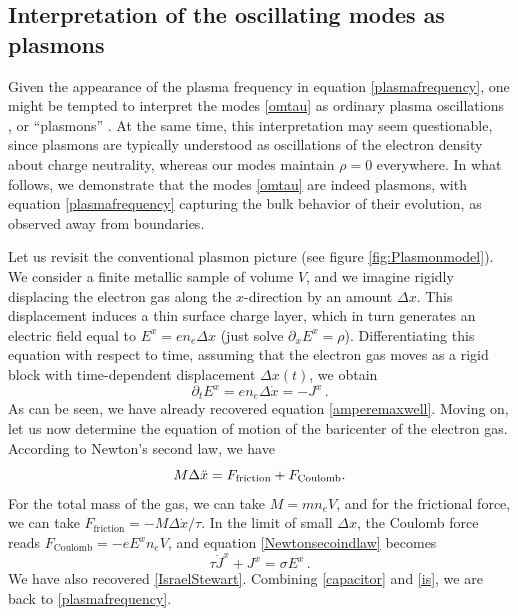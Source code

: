 \documentclass[a4paper, amsfonts, amssymb, amsmath, reprint, showkeys, nofootinbib, twoside,notitlepage,onecolumn]{revtex4-1}
\theoremstyle{definition}
\theoremstyle{theorem}
\begin{document}
\subsection{Interpretation of the oscillating modes as plasmons}

Given the appearance of the plasma frequency in equation \eqref{plasmafrequency}, one might be tempted to interpret the modes \eqref{omtau} as ordinary plasma oscillations \cite[\S 1.5]{Fitzpatrick2020}, or ``plasmons'' \cite{PinesNozieres1958}. At the same time, this interpretation may seem questionable, since plasmons are typically understood as oscillations of the electron density about charge neutrality, whereas our modes maintain $\rho=0$ everywhere. In what follows, we demonstrate that the modes \eqref{omtau} are indeed plasmons, with equation \eqref{plasmafrequency} capturing the bulk behavior of their evolution, as observed away from boundaries.

Let us revisit the conventional plasmon picture \cite[\S 1]{ashcroft1976solid} (see figure \ref{fig:Plasmonmodel}). We consider a finite metallic sample of volume $V$, and we imagine rigidly displacing the electron gas along the $x$-direction by an amount $\Delta x$. This displacement induces a thin surface charge layer, which in turn generates an electric field equal to $E^x = e n_e \Delta x$ (just solve $\partial_x E^x=\rho$). Differentiating this equation with respect to time, assuming that the electron gas moves as a rigid block with time-dependent displacement $\Delta x(t)$, we obtain
\begin{equation}\label{capacitor}
\partial_t E^x = e n_e \Delta \dot{x}=-J^x \, .
\end{equation} 
As can be seen, we have already recovered equation \eqref{amperemaxwell}. Moving on, let us now determine the equation of motion of the baricenter of the electron gas. According to Newton's second law, we have
\begin{equation}\label{Newtonsecoindlaw}
M \Delta \Ddot{x}= F_{\text{friction}}+F_{\text{Coulomb}} .
\end{equation}
For the total mass of the gas, we can take $M=mn_e V$, and for the frictional force, we can take $F_{\text{friction}}=-M\Delta \Dot{x}/\tau$. In the limit of small $\Delta x$, the Coulomb force reads $F_{\text{Coulomb}}=-e E^x n_e V$, and equation \eqref{Newtonsecoindlaw} becomes
\begin{equation}\label{is}
\tau \Dot{J}^x+J^x=\sigma E^x \, .
\end{equation}
We have also recovered \eqref{IsraelStewart}. Combining \eqref{capacitor} and \eqref{is}, we are back to \eqref{plasmafrequency}.
\end{document}

